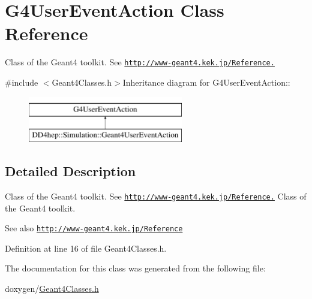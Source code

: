 \hypertarget{class_g4_user_event_action}{
\section{G4UserEventAction Class Reference}
\label{class_g4_user_event_action}
}


Class of the Geant4 toolkit. See \href{http://www-geant4.kek.jp/Reference.}{\tt http://www-\/geant4.kek.jp/Reference.}  


{\ttfamily \#include $<$Geant4Classes.h$>$}Inheritance diagram for G4UserEventAction::\begin{figure}[H]
\begin{center}
\leavevmode
\includegraphics[height=2cm]{class_g4_user_event_action}
\end{center}
\end{figure}


\subsection{Detailed Description}
Class of the Geant4 toolkit. See \href{http://www-geant4.kek.jp/Reference.}{\tt http://www-\/geant4.kek.jp/Reference.} Class of the Geant4 toolkit. \begin{DoxySeeAlso}{See also}
\href{http://www-geant4.kek.jp/Reference}{\tt http://www-\/geant4.kek.jp/Reference} 
\end{DoxySeeAlso}


Definition at line 16 of file Geant4Classes.h.

The documentation for this class was generated from the following file:\begin{DoxyCompactItemize}
\item 
doxygen/\hyperlink{_geant4_classes_8h}{Geant4Classes.h}\end{DoxyCompactItemize}
